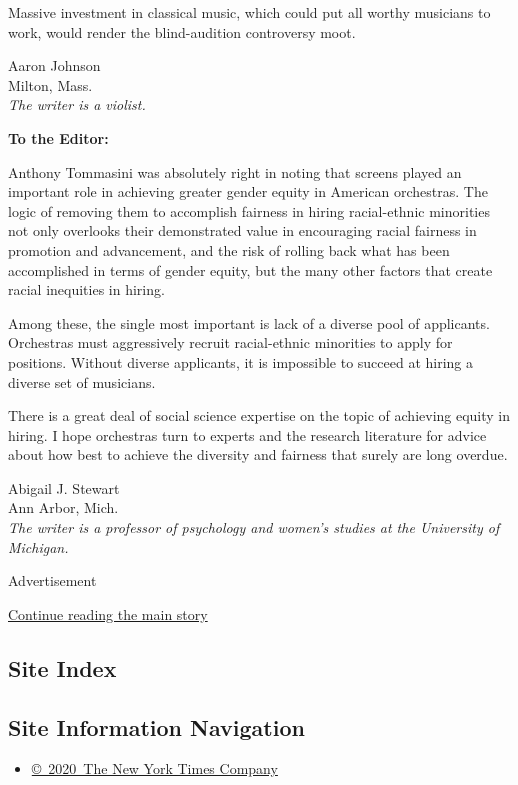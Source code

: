 Massive investment in classical music, which could put all worthy
musicians to work, would render the blind-audition controversy moot.

Aaron Johnson\\
Milton, Mass.\\
\emph{The writer is a violist.}

\textbf{To the Editor:}

Anthony Tommasini was absolutely right in noting that screens played an
important role in achieving greater gender equity in American
orchestras. The logic of removing them to accomplish fairness in hiring
racial-ethnic minorities not only overlooks their demonstrated value in
encouraging racial fairness in promotion and advancement, and the risk
of rolling back what has been accomplished in terms of gender equity,
but the many other factors that create racial inequities in hiring.

Among these, the single most important is lack of a diverse pool of
applicants. Orchestras must aggressively recruit racial-ethnic
minorities to apply for positions. Without diverse applicants, it is
impossible to succeed at hiring a diverse set of musicians.

There is a great deal of social science expertise on the topic of
achieving equity in hiring. I hope orchestras turn to experts and the
research literature for advice about how best to achieve the diversity
and fairness that surely are long overdue.

Abigail J. Stewart\\
Ann Arbor, Mich.\\
\emph{The writer is a professor of psychology and women's studies at the
University of Michigan.}

Advertisement

\protect\hyperlink{after-bottom}{Continue reading the main story}

\hypertarget{site-index}{%
\subsection{Site Index}\label{site-index}}

\hypertarget{site-information-navigation}{%
\subsection{Site Information
Navigation}\label{site-information-navigation}}

\begin{itemize}
\tightlist
\item
  \href{https://help.nytimes.com/hc/en-us/articles/115014792127-Copyright-notice}{©~2020~The
  New York Times Company}
\end{itemize}

